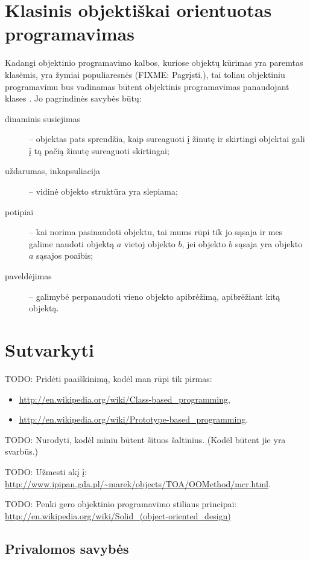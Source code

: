 \section{Klasinis objektiškai orientuotas programavimas}

Kadangi objektinio programavimo kalbos, kuriose objektų kūrimas yra
paremtas klasėmis, yra žymiai populiaresnės (FIXME: Pagrįsti.), tai
toliau objektiniu programavimu bus vadinamas būtent objektinis
programavimas panaudojant klases . Jo
pagrindinės savybės būtų:
\begin{description}
  \item[dinaminis susiejimas] – objektas pats sprendžia, kaip sureaguoti
    į žinutę ir skirtingi objektai gali į tą pačią žinutę sureaguoti
    skirtingai;
  \item[uždarumas, inkapsuliacija] – vidinė objekto struktūra yra
    slepiama;
  \item[potipiai] – kai norima pasinaudoti objektu, tai mums rūpi tik
    jo sąsaja ir mes galime naudoti objektą $a$ vietoj objekto $b$,
    jei objekto $b$ sąsaja yra objekto $a$ sąsajos poaibis;
  \item[paveldėjimas] – galimybė perpanaudoti vieno objekto apibrėžimą,
    apibrėžiant kitą objektą.
\end{description}

\section{Sutvarkyti}

TODO: Pridėti paaiškinimą, kodėl man rūpi tik pirmas:
\begin{itemize}
  \item \url{http://en.wikipedia.org/wiki/Class-based_programming},
  \item \url{http://en.wikipedia.org/wiki/Prototype-based_programming}.
\end{itemize}

TODO: Nurodyti, kodėl miniu būtent šituos šaltinius. (Kodėl būtent jie
yra svarbūs.)

TODO: Užmesti akį į:
\url{http://www.ipipan.gda.pl/~marek/objects/TOA/OOMethod/mcr.html}.

TODO: Penki gero objektinio programavimo stiliaus principai:
\url{http://en.wikipedia.org/wiki/Solid_(object-oriented_design)}

\subsection{Privalomos savybės}
